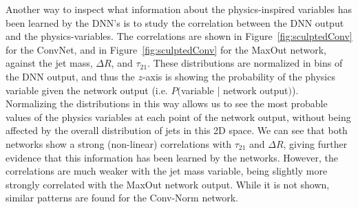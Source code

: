 Another way to inspect what information about the physics-inspired variables has been learned by the DNN's is to study the correlation between the DNN output and the physics-variables.  The correlations are shown in Figure~\ref{fig:sculptedConv} for the ConvNet, and in Figure~\ref{fig:sculptedConv} for the MaxOut network,  against the jet mass, $\Delta R$, and $\tau_{21}$.   These distributions are normalized in bins of the DNN output, and thus the $z$-axis is showing the probability of the physics variable given the network output (i.e. $P($variable | network output$)$). Normalizing the distributions in this way allows us to see the most probable values of the physics variables at each point of the network output, without being affected by the overall distribution of jets in this 2D space.  We can see that both networks show a strong (non-linear) correlations with $\tau_{21}$ and $\Delta R$, giving further evidence that this information has been learned by the networks.  However, the correlations are much weaker with the jet mass variable, being slightly more strongly correlated with the MaxOut network output.  While it is not shown, similar patterns are found for the Conv-Norm network.
